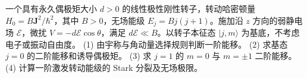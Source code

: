 一个具有永久偶极矩大小 \(d>0\) 的线性极性刚性转子，转动哈密顿量 \(H_0=B\boldsymbol J^2/\hbar^2\)，其中 \(B>0\)，无场能级 \(E_j=Bj(j+1)\)。施加沿 \(z\) 方向的弱静电场 \(\mathcal E\)，微扰 \(V=-d\mathcal E\cos\theta\)，满足 \(d\mathcal E\ll B\)。以转子本征态 \(|j,m\rangle\) 为基底，不考虑电子或振动自由度。
(1) 由宇称与角动量选择规则判断一阶能移。
(2) 求基态 \(j=0\) 的二阶能移和诱导偶极矩。
(3) 求 \(j=1\) 的 \(m=0\) 与 \(m=\pm1\) 二阶能移。
(4) 计算一阶激发转动能级的 Stark 分裂及无场极限。
